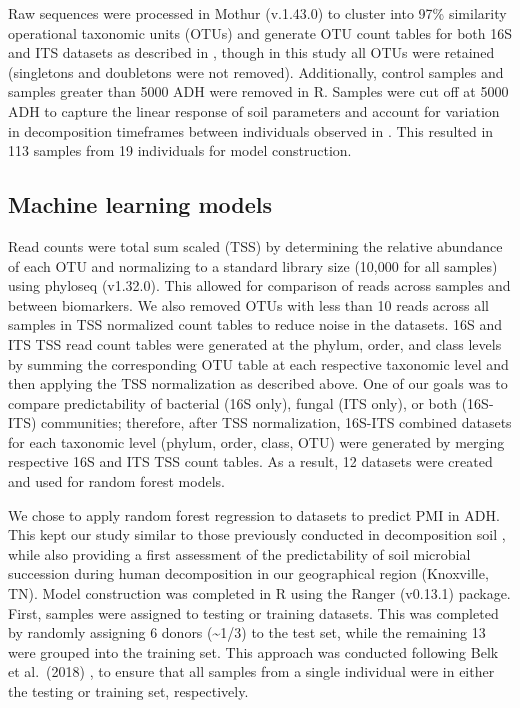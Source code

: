\documentclass[
  10pt,
  letterpaper,
]{article}
\begin{document}
Raw sequences were processed in Mothur \citep{schloss_introducing_2009}
(v.1.43.0) to cluster into 97\% similarity operational taxonomic units
(OTUs) and generate OTU count tables for both 16S and ITS datasets as
described in \citep{mason_body_2022}, though in this study all OTUs were
retained (singletons and doubletons were not removed). Additionally,
control samples and samples greater than 5000 ADH were removed in R.
Samples were cut off at 5000 ADH to capture the linear response of soil
parameters and account for variation in decomposition timeframes between
individuals observed in \citep{mason_body_2022}. This resulted in 113
samples from 19 individuals for model construction.

\hypertarget{machine-learning-models}{%
\subsection{Machine learning models}\label{machine-learning-models}}

Read counts were total sum scaled (TSS) by determining the relative
abundance of each OTU and normalizing to a standard library size (10,000
for all samples) using phyloseq \citep{mcmurdie_phyloseq_2013}
(v1.32.0). This allowed for comparison of reads across samples and
between biomarkers. We also removed OTUs with less than 10 reads across
all samples in TSS normalized count tables to reduce noise in the
datasets. 16S and ITS TSS read count tables were generated at the
phylum, order, and class levels by summing the corresponding OTU table
at each respective taxonomic level and then applying the TSS
normalization as described above. One of our goals was to compare
predictability of bacterial (16S only), fungal (ITS only), or both
(16S-ITS) communities; therefore, after TSS normalization, 16S-ITS
combined datasets for each taxonomic level (phylum, order, class, OTU)
were generated by merging respective 16S and ITS TSS count tables. As a
result, 12 datasets were created and used for random forest models.

We chose to apply random forest regression to datasets to predict PMI in
ADH. This kept our study similar to those previously conducted in
decomposition soil \citep{belk_microbiome_2018}, while also providing a
first assessment of the predictability of soil microbial succession
during human decomposition in our geographical region (Knoxville, TN).
Model construction was completed in R using the Ranger
\citep{wright_ranger_2017} (v0.13.1) package. First, samples were
assigned to testing or training datasets. This was completed by randomly
assigning 6 donors (\textasciitilde1/3) to the test set, while the
remaining 13 were grouped into the training set. This approach was
conducted following Belk et al.~(2018) \citep{belk_microbiome_2018}, to
ensure that all samples from a single individual were in either the
testing or training set, respectively.
\end{document}
